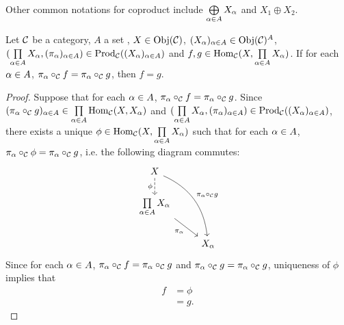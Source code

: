\documentclass{book}
\begin{document}
	\begin{note}
		Other common notations for coproduct include $\bigoplus\limits_{\alpha \in A} X_{\alpha}$ and $X_1 \oplus X_2$.
	\end{note}
	
	\begin{ex}
		Let $\mathcal{C}$ be a category, $A$ a set , $X \in \operatorname{Obj}(\mathcal{C})$, $(X_{\alpha})_{\alpha \in A} \in \operatorname{Obj}(\mathcal{C})^A$, $(\prod\limits_{\alpha \in A} X_{\alpha}, (\pi_{\alpha})_{\alpha \in A}) \in \operatorname{Prod}_{\mathcal{C}}((X_{\alpha})_{\alpha \in A})$ and $f,g \in \operatorname{Hom}_{\mathcal{C}}(X, \prod\limits_{\alpha \in A} X_{\alpha})$. If for each $\alpha \in A$, $\pi_{\alpha} \circ_{\mathcal{C}} f = \pi_{\alpha} \circ_{\mathcal{C}} g$, then $f = g$. 
	\end{ex}
	
	\begin{proof}
		Suppose that for each $\alpha \in A$, $\pi_{\alpha} \circ_{\mathcal{C}} f = \pi_{\alpha} \circ_{\mathcal{C}} g$. Since $(\pi_{\alpha} \circ_{\mathcal{C}} g)_{\alpha \in A} \in \prod\limits_{\alpha \in A} \operatorname{Hom}_{\mathcal{C}}(X, X_{\alpha})$ and $(\prod\limits_{\alpha \in A} X_{\alpha}, (\pi_{\alpha})_{\alpha \in A}) \in \operatorname{Prod}_{\mathcal{C}}((X_{\alpha})_{\alpha \in A})$, there exists a unique $\phi \in \operatorname{Hom}_{\mathcal{C}}(X, \prod\limits_{\alpha \in A} X_{\alpha})$ such that for each $\alpha \in A$, $\pi_{\alpha} \circ_{\mathcal{C}} \phi = \pi_{\alpha} \circ_{\mathcal{C}} g$, i.e. the following diagram commutes: 
		\[
		\begin{tikzcd}[baseline= 7]
			X   \arrow[d, "\phi"', dashed]  \arrow[ddr, "\pi_{\al} \circ_{\MC} g"', bend left=30, swap]    &  \\
			\prod\limits_{\al \in A} X_{\al} \arrow[dr, "\pi_{\al}"']                        & \\
			& X_{\al}   
		\end{tikzcd}
		\]
		Since for each $\alpha \in A$, $\pi_{\alpha} \circ_{\mathcal{C}} f = \pi_{\alpha} \circ_{\mathcal{C}} g$ and $\pi_{\alpha} \circ_{\mathcal{C}} g = \pi_{\alpha} \circ_{\mathcal{C}} g$, uniqueness of $\phi$ implies that 
		\begin{align*}
			f
			& = \phi \\
			& = g.
		\end{align*}
	\end{proof}
	
\end{document}
